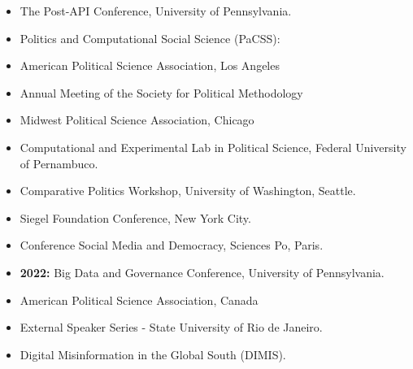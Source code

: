 \documentclass[letterpaper, 11pt]{article}
\begin{document}
\begin{itemize}[leftmargin=0cm, noitemsep]
    \item \hspace{1.25cm} The Post-API Conference, University of Pennsylvania.
    \item \hspace{1.25cm} Politics and Computational Social Science (PaCSS):
    \item \hspace{1.25cm} American Political Science Association, Los Angeles
    \item \hspace{1.25cm} Annual Meeting of the Society for Political Methodology
    \item \hspace{1.25cm} Midwest Political Science Association, Chicago
    \item \hspace{1.25cm} Computational and Experimental Lab in Political Science, Federal University of Pernambuco.
    \item \hspace{1.25cm} Comparative Politics Workshop, University of Washington, Seattle.
    \item \hspace{1.25cm}  Siegel Foundation Conference, New York City.
    \item \hspace{1.25cm}  Conference Social Media and Democracy, Sciences Po, Paris.

    \vspace{.2cm}

    \item \textbf{2022:} \hspace{.02cm} Big Data and Governance Conference, University of Pennsylvania.
    \item \hspace{1.25cm} American Political Science Association, Canada
    \item \hspace{1.25cm}  External Speaker Series - State University of Rio de Janeiro.
    \item \hspace{1.25cm}  Digital Misinformation in the Global South (DIMIS).

    \vspace{.2cm}


\end{itemize}
\end{document}
